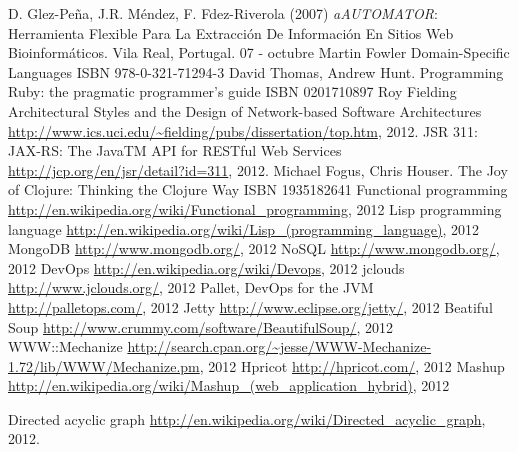 \documentclass[a4paper,12pt,twoside]{report}
\begin{document}
\begin{thebibliography}{1}

  D. Glez-Peña, J.R. Méndez, F. Fdez-Riverola (2007)
  \newblock \emph{aAUTOMATOR}: Herramienta Flexible Para La
  Extracción De Información En Sitios Web Bioinformáticos. Vila Real,
  Portugal. 07 - octubre
  Martin Fowler
  \newblock Domain-Specific Languages
  \newblock ISBN 978-0-321-71294-3
  David Thomas, Andrew Hunt.
  \newblock Programming Ruby: the pragmatic programmer's guide
  \newblock ISBN 0201710897
  Roy Fielding
  \newblock Architectural Styles and
  the Design of Network-based Software Architectures
  \newblock
  \url{http://www.ics.uci.edu/~fielding/pubs/dissertation/top.htm},
  2012.
  \newblock JSR 311: JAX-RS: The JavaTM API for RESTful Web Services
  \newblock \url{http://jcp.org/en/jsr/detail?id=311}, 2012.
  Michael Fogus, Chris Houser.
  \newblock The Joy of Clojure: Thinking the Clojure Way
  \newblock ISBN 1935182641
  \newblock Functional programming
  \newblock \url{http://en.wikipedia.org/wiki/Functional_programming}, 2012
  \newblock Lisp programming language
  \newblock \url{http://en.wikipedia.org/wiki/Lisp_(programming_language)}, 2012
  \newblock MongoDB
  \newblock \url{http://www.mongodb.org/}, 2012
  \newblock NoSQL
  \newblock \url{http://www.mongodb.org/}, 2012
  \newblock DevOps
  \url{http://en.wikipedia.org/wiki/Devops}, 2012
  \newblock jclouds
  \newblock \url{http://www.jclouds.org/}, 2012
  \newblock Pallet, DevOps for the JVM
  \newblock \url{http://palletops.com/}, 2012
  \newblock Jetty
  \newblock \url{http://www.eclipse.org/jetty/}, 2012
  \newblock Beatiful Soup
  \newblock \url{http://www.crummy.com/software/BeautifulSoup/}, 2012
  \newblock WWW::Mechanize
  \newblock
  \url{http://search.cpan.org/~jesse/WWW-Mechanize-1.72/lib/WWW/Mechanize.pm},
  2012
  \newblock Hpricot
  \newblock \url{http://hpricot.com/}, 2012
  \newblock Mashup
  \newblock \url{http://en.wikipedia.org/wiki/Mashup_(web_application_hybrid)}, 2012

\newblock Directed acyclic graph
\newblock \url{http://en.wikipedia.org/wiki/Directed_acyclic_graph}, 2012.

\end{thebibliography}
\end{document}
